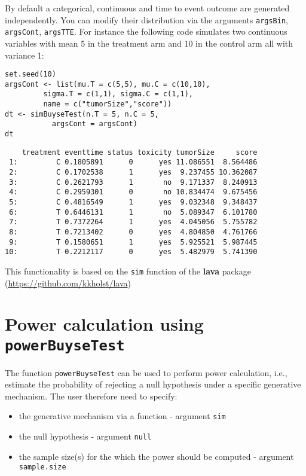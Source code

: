 \documentclass[12pt]{article}
\begin{document}
By default a categorical, continuous and time to event outcome are
generated independently. You can modify their distribution via the
arguments \texttt{argsBin}, \texttt{argsCont}, \texttt{argsTTE}. For instance the following
code simulates two continuous variables with mean 5 in the treatment
arm and 10 in the control arm all with variance 1:
\lstset{language=r,label= ,caption= ,captionpos=b,numbers=none}
\begin{lstlisting}
set.seed(10)
argsCont <- list(mu.T = c(5,5), mu.C = c(10,10), 
		 sigma.T = c(1,1), sigma.C = c(1,1),
		 name = c("tumorSize","score"))
dt <- simBuyseTest(n.T = 5, n.C = 5,
		   argsCont = argsCont)
dt
\end{lstlisting}

\begin{verbatim}
    treatment eventtime status toxicity tumorSize     score
 1:         C 0.1805891      0      yes 11.086551  8.564486
 2:         C 0.1702538      1      yes  9.237455 10.362087
 3:         C 0.2621793      1       no  9.171337  8.240913
 4:         C 0.2959301      0       no 10.834474  9.675456
 5:         C 0.4816549      1      yes  9.032348  9.348437
 6:         T 0.6446131      1       no  5.089347  6.101780
 7:         T 0.7372264      1      yes  4.045056  5.755782
 8:         T 0.7213402      0      yes  4.804850  4.761766
 9:         T 0.1580651      1      yes  5.925521  5.987445
10:         T 0.2212117      0      yes  5.482979  5.741390
\end{verbatim}

This functionality is based on the \texttt{sim} function of the \textbf{lava}
package (\url{https://github.com/kkholst/lava})

\clearpage

\section{Power calculation using \texttt{powerBuyseTest}}
\label{sec:orgc8a594b}

The function \texttt{powerBuyseTest} can be used to perform power
calculation, i.e., estimate the probability of rejecting a null
hypothesis under a specific generative mechanism. The user therefore
need to specify:
\begin{itemize}
\item the generative mechanism via a function \hfill - argument \texttt{sim}
\item the null hypothesis \hfill - argument \texttt{null}
\item the sample size(s) for the which the power should be computed  \hfill - argument \texttt{sample.size}
\end{itemize}
\end{document}
